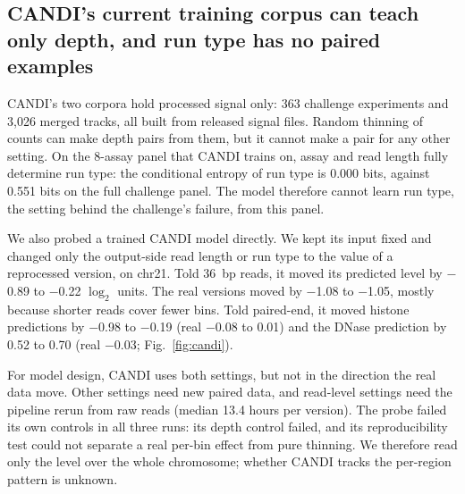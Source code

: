 \documentclass[pdflatex,sn-mathphys-num]{sn-jnl}
\newcommand{\lit}[1]{#1}
\newcommand{\bitsFull}{0.551}
\newcommand{\bitsPanel}{0.000}
\newcommand{\corpEic}{363}
\newcommand{\corpMerged}{3{,}026}
\newcommand{\costFastq}{13.4}
\newcommand{\nPanelAssays}{8}
\newcommand{\swDPredHi}{0.70}
\newcommand{\swDPredLo}{0.52}
\newcommand{\swDRealLo}{\ensuremath{-}0.03}
\newcommand{\swLPredHi}{\ensuremath{-}0.22}
\newcommand{\swLPredLo}{\ensuremath{-}0.89}
\newcommand{\swLRealHi}{\ensuremath{-}1.05}
\newcommand{\swLRealLo}{\ensuremath{-}1.08}
\newcommand{\swPPredHi}{\ensuremath{-}0.19}
\newcommand{\swPPredLo}{\ensuremath{-}0.98}
\newcommand{\swPRealHi}{0.01}
\newcommand{\swPRealLo}{\ensuremath{-}0.08}
\begin{document}
\subsection{CANDI's current training corpus can teach only depth, and run type has no paired examples}\label{sec:r12}

CANDI's two corpora hold processed signal only: \corpEic{} challenge experiments and
\corpMerged{} merged tracks, all built from released signal files. Random thinning of counts can
make depth pairs from them, but it cannot make a pair for any other setting. On the \nPanelAssays{}-assay
panel that CANDI trains on, assay and read length fully determine run type: the conditional
entropy of run type is \bitsPanel{} bits, against \bitsFull{} bits on the full challenge panel.
The model therefore cannot learn run type, the setting behind the challenge's failure, from
this panel.

We also probed a trained CANDI model directly. We kept its input fixed and changed only the
output-side read length or run type to the value of a reprocessed version, on \lit{chr21}. Told
\lit{36}~bp reads, it moved its predicted level by \swLPredLo{} to \swLPredHi{} $\log_{\lit{2}}$
units. The real versions moved by \swLRealLo{} to \swLRealHi{}, mostly because shorter reads
cover fewer bins. Told paired-end, it moved histone predictions by \swPPredLo{} to \swPPredHi{}
(real \swPRealLo{} to \swPRealHi{}) and the DNase prediction by \swDPredLo{} to \swDPredHi{} (real
\swDRealLo{}; Fig.~\ref{fig:candi}).

For model design, CANDI uses both settings, but not in the direction the real data move. Other
settings need new paired data, and read-level settings need the pipeline rerun from raw reads
(median \costFastq{} hours per version). The probe failed its own controls in all three runs:
its depth control failed, and its reproducibility test could not separate a real per-bin
effect from pure thinning. We therefore read only the level over the whole chromosome; whether
CANDI tracks the per-region pattern is unknown.
\end{document}
